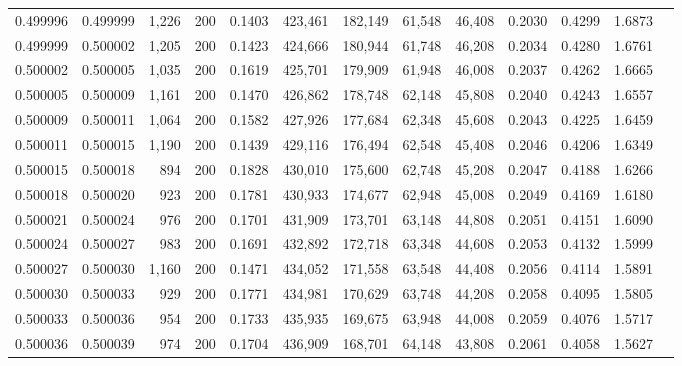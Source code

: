 \begin{tabular}{rrrrrrrrrrrrr}
0.499996 & 0.499999 & 1,226 & 200 &                                     0.1403 & 423,461 & 182,149 &  61,548 &  46,408 & 0.2030 & 0.4299 & 1.6873 \\
0.499999 & 0.500002 & 1,205 & 200 &                                     0.1423 & 424,666 & 180,944 &  61,748 &  46,208 & 0.2034 & 0.4280 & 1.6761 \\
0.500002 & 0.500005 & 1,035 & 200 &                                     0.1619 & 425,701 & 179,909 &  61,948 &  46,008 & 0.2037 & 0.4262 & 1.6665 \\
0.500005 & 0.500009 & 1,161 & 200 &                                     0.1470 & 426,862 & 178,748 &  62,148 &  45,808 & 0.2040 & 0.4243 & 1.6557 \\
0.500009 & 0.500011 & 1,064 & 200 &                                     0.1582 & 427,926 & 177,684 &  62,348 &  45,608 & 0.2043 & 0.4225 & 1.6459 \\
0.500011 & 0.500015 & 1,190 & 200 &                                     0.1439 & 429,116 & 176,494 &  62,548 &  45,408 & 0.2046 & 0.4206 & 1.6349 \\
0.500015 & 0.500018 &   894 & 200 &                                     0.1828 & 430,010 & 175,600 &  62,748 &  45,208 & 0.2047 & 0.4188 & 1.6266 \\
0.500018 & 0.500020 &   923 & 200 &                                     0.1781 & 430,933 & 174,677 &  62,948 &  45,008 & 0.2049 & 0.4169 & 1.6180 \\
0.500021 & 0.500024 &   976 & 200 &                                     0.1701 & 431,909 & 173,701 &  63,148 &  44,808 & 0.2051 & 0.4151 & 1.6090 \\
0.500024 & 0.500027 &   983 & 200 &                                     0.1691 & 432,892 & 172,718 &  63,348 &  44,608 & 0.2053 & 0.4132 & 1.5999 \\
0.500027 & 0.500030 & 1,160 & 200 &                                     0.1471 & 434,052 & 171,558 &  63,548 &  44,408 & 0.2056 & 0.4114 & 1.5891 \\
0.500030 & 0.500033 &   929 & 200 &                                     0.1771 & 434,981 & 170,629 &  63,748 &  44,208 & 0.2058 & 0.4095 & 1.5805 \\
0.500033 & 0.500036 &   954 & 200 &                                     0.1733 & 435,935 & 169,675 &  63,948 &  44,008 & 0.2059 & 0.4076 & 1.5717 \\
0.500036 & 0.500039 &   974 & 200 &                                     0.1704 & 436,909 & 168,701 &  64,148 &  43,808 & 0.2061 & 0.4058 & 1.5627 \\

\end{tabular}
